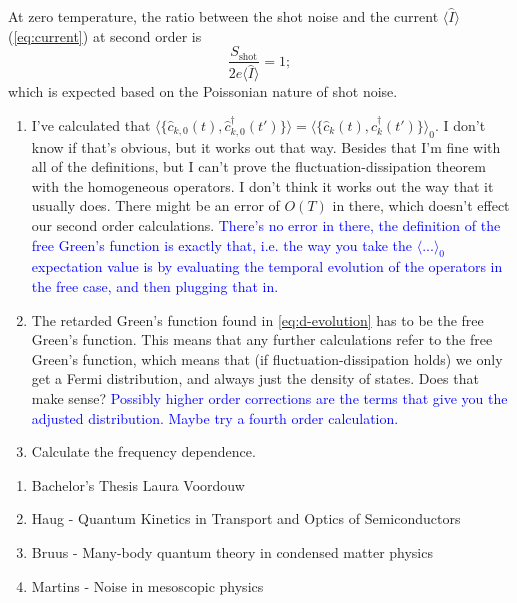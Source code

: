 At zero temperature, the ratio between the shot noise and the current $\langle\hat{I}\rangle$ (\autoref{eq:current}) at second order is 
\begin{equation}
    \frac{S_{\textrm{shot}}}{2e\langle\hat{I}\rangle} = 1;
\end{equation}
which is expected based on the Poissonian nature of shot noise.

\begin{tcolorbox}[title = Questions/Ideas, colback = gray!5, colframe=black]
    \begin{enumerate}
        \item I've calculated that $\langle\{\hat{c}_{k,0}(t),\hat{c}_{k,0}^\dagger(t')\}\rangle = \langle\{\hat{c}_{k}(t),\hat{c}_{k}^\dagger(t')\}\rangle_0$. I don't know if that's obvious, but it works out that way. Besides that I'm fine with all of the definitions, but I can't prove the fluctuation-dissipation theorem with the homogeneous operators. I don't think it works out the way that it usually does. There might be an error of $O(T)$ in there, which doesn't effect our second order calculations. \textcolor{blue}{There's no error in there, the definition of the free Green's function is exactly that, i.e. the way you take the $\langle...\rangle_0$ expectation value is by evaluating the temporal evolution of the operators in the free case, and then plugging that in.}
        \item The retarded Green's function found in \autoref{eq:d-evolution} has to be the free Green's function. This means that any further calculations refer to the free Green's function, which means that (if fluctuation-dissipation holds) we only get a Fermi distribution, and always just the density of states. Does that make sense? \textcolor{blue}{Possibly higher order corrections are the terms that give you the adjusted distribution. Maybe try a fourth order calculation.}
        \item Calculate the frequency dependence.
    \end{enumerate}
\end{tcolorbox}


\begin{tcolorbox}[title = Sources, colback = gray!5, colframe=gray]
    \begin{enumerate}
        \item Bachelor's Thesis Laura Voordouw
        \item Haug - Quantum Kinetics in Transport and Optics of Semiconductors
        \item Bruus - Many-body quantum theory in condensed matter physics
        \item Martins - Noise in mesoscopic physics
    \end{enumerate}
\end{tcolorbox}


